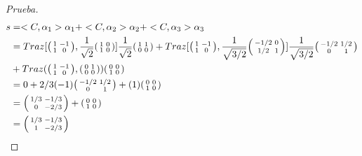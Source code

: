 \documentclass[12pt]{article}
\newenvironment{xmat}
  {\left(\begin{smallmatrix}}
  {\end{smallmatrix}\right)}
\begin{document}
\begin{proof}[Prueba]
\begin{align*}
s & = <C, \alpha_{1}>\alpha_{1} + <C, \alpha_{2}>\alpha_{2} + <C, \alpha_{3}>\alpha_{3} \\
& = Traz[\begin{xmat}1 & -1\\1 & 0\end{xmat}, \frac{1}{\sqrt{2}}\begin{xmat}1 & 0\\1 & 0\end{xmat}]\frac{1}{\sqrt{2}}\begin{xmat}1 & 1\\0 & 0\end{xmat}
   +Traz[\begin{xmat}1 & -1\\1 & 0\end{xmat}, \frac{1}{\sqrt{3/2}}\begin{xmat}-1/2 & 0\\1/2 & 1\end{xmat}]\frac{1}{\sqrt{3/2}}\begin{xmat}-1/2 & 1/2\\0 & 1\end{xmat} \\  
&  +Traz(\begin{xmat}1 & -1\\1 & 0\end{xmat}, \begin{xmat}0 & 1\\0 & 0\end{xmat})
	\begin{xmat}0 & 0\\1 & 0\end{xmat} \\
 & = 0 + 2/3(-1)\begin{xmat}-1/2 & 1/2\\0 & 1\end{xmat} + (1)\begin{xmat}0 & 0\\1 & 0\end{xmat} \\
 & =\begin{xmat}1/3 & -1/3\\0 & -2/3\end{xmat} + \begin{xmat}0 & 0\\1 & 0\end{xmat} \\
 & = \begin{xmat}1/3 & -1/3\\1 & -2/3\end{xmat}
\end{align*}
\end{proof}
 
\end{document}
